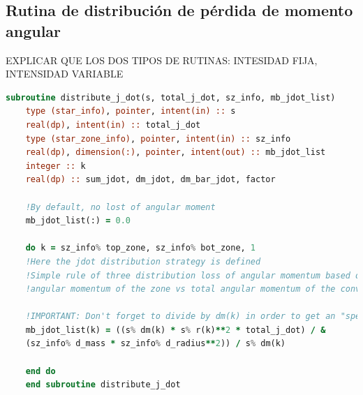 \subsection{Rutina de distribución de pérdida de momento angular}
EXPLICAR QUE LOS DOS TIPOS DE RUTINAS: INTESIDAD FIJA, INTENSIDAD VARIABLE
\begin{lstlisting}[language=Fortran, caption={Rutina de distribución de pérdida de momento angular.}, label={lst:dis_jdot}]
	subroutine distribute_j_dot(s, total_j_dot, sz_info, mb_jdot_list)
	type (star_info), pointer, intent(in) :: s
	real(dp), intent(in) :: total_j_dot
	type (star_zone_info), pointer, intent(in) :: sz_info
	real(dp), dimension(:), pointer, intent(out) :: mb_jdot_list
	integer :: k
	real(dp) :: sum_jdot, dm_jdot, dm_bar_jdot, factor
	
	!By default, no lost of angular moment
	mb_jdot_list(:) = 0.0
	
	do k = sz_info% top_zone, sz_info% bot_zone, 1
	!Here the jdot distribution strategy is defined
	!Simple rule of three distribution loss of angular momentum based on the 
	!angular momentum of the zone vs total angular momentum of the convective zone
	
	!IMPORTANT: Don't forget to divide by dm(k) in order to get an "specific" jdot
	mb_jdot_list(k) = ((s% dm(k) * s% r(k)**2 * total_j_dot) / &
	(sz_info% d_mass * sz_info% d_radius**2)) / s% dm(k)
	
	end do
	end subroutine distribute_j_dot
	
\end{lstlisting}





\endinput
